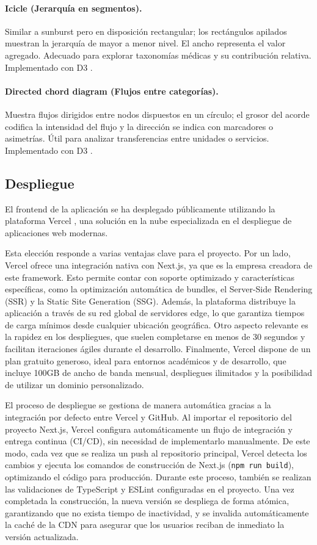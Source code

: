 \paragraph{Icicle (Jerarquía en segmentos).} Similar a sunburst pero en disposición rectangular; los rectángulos apilados muestran la jerarquía de mayor a menor nivel. El ancho representa el valor agregado. Adecuado para explorar taxonomías médicas y su contribución relativa. Implementado con D3 \cite{icicle,d3}.

\paragraph{Directed chord diagram (Flujos entre categorías).} Muestra flujos dirigidos entre nodos dispuestos en un círculo; el grosor del acorde codifica la intensidad del flujo y la dirección se indica con marcadores o asimetrías. Útil para analizar transferencias entre unidades o servicios. Implementado con D3 \cite{chord,d3}.

\subsection{Despliegue}

El frontend de la aplicación se ha desplegado públicamente utilizando la plataforma Vercel \cite{vercel}, una solución en la nube especializada en el despliegue de aplicaciones web modernas. 

Esta elección responde a varias ventajas clave para el proyecto. Por un lado, Vercel ofrece una integración nativa con Next.js, ya que es la empresa creadora de este framework. Esto permite contar con soporte optimizado y características específicas, como la optimización automática de bundles, el Server-Side Rendering (SSR) y la Static Site Generation (SSG). Además, la plataforma distribuye la aplicación a través de su red global de servidores edge, lo que garantiza tiempos de carga mínimos desde cualquier ubicación geográfica. Otro aspecto relevante es la rapidez en los despliegues, que suelen completarse en menos de 30 segundos y facilitan iteraciones ágiles durante el desarrollo. Finalmente, Vercel dispone de un plan gratuito generoso, ideal para entornos académicos y de desarrollo, que incluye 100GB de ancho de banda mensual, despliegues ilimitados y la posibilidad de utilizar un dominio personalizado.

El proceso de despliegue se gestiona de manera automática gracias a la integración por defecto entre Vercel y GitHub. Al importar el repositorio del proyecto Next.js, Vercel configura automáticamente un flujo de integración y entrega continua (CI/CD), sin necesidad de implementarlo manualmente. De este modo, cada vez que se realiza un push al repositorio principal, Vercel detecta los cambios y ejecuta los comandos de construcción de Next.js (\texttt{npm run build}), optimizando el código para producción. Durante este proceso, también se realizan las validaciones de TypeScript y ESLint configuradas en el proyecto. Una vez completada la construcción, la nueva versión se despliega de forma atómica, garantizando que no exista tiempo de inactividad, y se invalida automáticamente la caché de la CDN para asegurar que los usuarios reciban de inmediato la versión actualizada.

